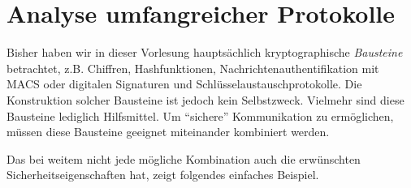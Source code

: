 \chapter{Analyse umfangreicher Protokolle}

Bisher haben wir in dieser Vorlesung hauptsächlich kryptographische
\emph{Bausteine} betrachtet, z.B. Chiffren, Hashfunktionen,
Nachrichtenauthentifikation mit MACS oder digitalen Signaturen und
Schlüsselaustauschprotokolle. 
Die Konstruktion solcher Bausteine ist jedoch kein Selbstzweck.
Vielmehr sind diese Bausteine lediglich Hilfsmittel. Um "`sichere"'
Kommunikation zu ermöglichen, müssen diese Bausteine geeignet
miteinander kombiniert werden. 

Das bei weitem nicht jede mögliche Kombination auch die erwünschten
Sicherheitseigenschaften hat, zeigt folgendes einfaches Beispiel.\\ 


